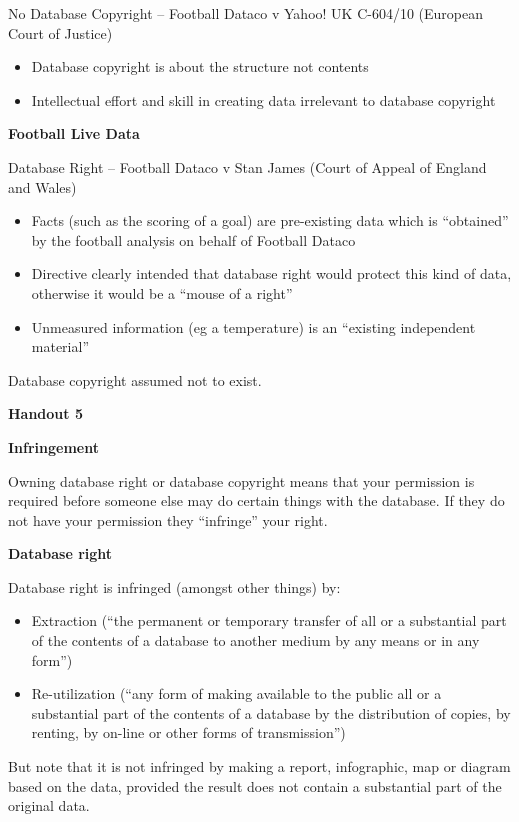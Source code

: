 No Database Copyright -- Football Dataco v Yahoo! UK C-604/10 (European
Court of Justice)

\begin{itemize}
\item
  Database copyright is about the structure not contents
\item
  Intellectual effort and skill in creating data irrelevant to database
  copyright
\end{itemize}

\textbf{Football Live Data}

Database Right -- Football Dataco v Stan James (Court of Appeal of
England and Wales)

\begin{itemize}
\item
  Facts (such as the scoring of a goal) are pre-existing data which is
  ``obtained'' by the football analysis on behalf of Football Dataco
\item
  Directive clearly intended that database right would protect this kind
  of data, otherwise it would be a ``mouse of a right''
\item
  Unmeasured information (eg a temperature) is an ``existing independent
  material''
\end{itemize}

Database copyright assumed not to exist.

\textbf{Handout 5}

\textbf{Infringement}

Owning database right or database copyright means that your permission
is required before someone else may do certain things with the database.
If they do not have your permission they ``infringe'' your right.

\textbf{Database right}

Database right is infringed (amongst other things) by:

\begin{itemize}
\item
  Extraction (``the permanent or temporary transfer of all or a
  substantial part of the contents of a database to another medium by
  any means or in any form'')
\item
  Re-utilization (``any form of making available to the public all or a
  substantial part of the contents of a database by the distribution of
  copies, by renting, by on-line or other forms of transmission'')
\end{itemize}

But note that it is not infringed by making a report, infographic, map
or diagram based on the data, provided the result does not contain a
substantial part of the original data.

